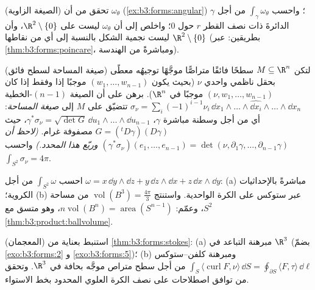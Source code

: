 \begin{exercise}[$\star\star$]\label{exo:b3:forms:4}
(الصيغة الزاوية) تحقق من أن $\omega_\theta$ (\cref{ex:b3:forms:angular}) ؛
واحسب $\int_\gamma\omega_\theta$ من أجل $\gamma$ الدائرةَ ذات نصف القطر $r$ حول
$0$؛ واخلص إلى أن $\omega_\theta$ ليست  على $\R^2\setminus\{0\}$، وأن
$\R^2\setminus\{0\}$ ليست نجمية الشكل بالنسبة إلى أي من نقاطها (بطريقين:
عبر \cref{thm:b3:forms:poincare}، ومباشرةً من الهندسة).
\end{exercise}

\begin{exercise}[$\star\star$]\label{exo:b3:forms:5}
(صيغة المساحة لسطح فائق) لتكن $M \subseteq \R^n$ سطحًا فائقًا متراصًّا
موجَّهًا توجيهُه معطًى بحقل ناظمي واحدي $\nu$ (بحيث يكون $(w_1, \dots, w_{n-1})$
موجبًا إذا وفقط إذا كان $(\nu, w_1, \dots, w_{n-1})$ موجبًا في $\R^n$). برهن على أن
الصيغة $(n-1)$-الخطية $\sigma_\nu =
\sum_i(-1)^{i-1}\nu_i\,\dd x_1\wedge\dots\wedge\widehat{\dd
x_i}\wedge\dots\wedge\dd x_n$ تتضيّق على $M$ إلى \emph{صيغة
المساحة}: أي من أجل وسطنة مباشرة $\gamma$، $\gamma^*\sigma_\nu = \sqrt{\det G}\,\dd u_1\wedge\dots
\wedge\dd u_{n-1}$، حيث $G = ({}^t D\gamma)(D\gamma)$
مصفوفة غرام. \emph{(لاحظ أن $(\gamma^*\sigma_\nu)(e_1, \dots, e_{n-1}) = \det(\nu,
\partial_1\gamma, \dots, \partial_{n-1}\gamma)$ وربّع هذا المحدد.)} واحسب
$\int_{S^2}\sigma_\nu = 4\pi$.
\end{exercise}

\begin{exercise}[$\star\star$]\label{exo:b3:forms:6}
احسب $\int_{S^2}\omega$ من أجل $\omega = x\,\dd y\wedge\dd z
+ y\,\dd z\wedge\dd x + z\,\dd x\wedge\dd y$: (a) مباشرةً بالإحداثيات الكروية؛
(b) عبر ستوكس على الكرة الواحدية. واستنتج $\operatorname{vol}(B^3) = \frac{4\pi}3$ من مساحة
$S^2$، وعمّم:
$n\operatorname{vol}(B^n) = \operatorname{area}(S^{n-1})$،
وهو متسق مع \cref{thm:b3:product:ballvolume}.
\end{exercise}

\begin{exercise}[$\star\star$]\label{exo:b3:forms:7}
(المعجمان) استنبط بعناية من \cref{thm:b3:forms:stokes}: (a) مبرهنة التباعد في
$\R^3$ (بضمّ \cref{exo:b3:forms:2} و \cref{exo:b3:forms:5})؛ (b) ومبرهنة
كلفن--ستوكس $\int_S\langle\operatorname{curl}F, \nu\rangle\,\dd S =
\oint_{\partial S}\langle F, \tau\rangle\,\dd\ell$ من أجل سطح متراص موجَّه بحافة في $\R^3$.
وتحقق من توافق اصطلاحات  على نصف الكرة العلوي المحدود
بخط الاستواء.
\end{exercise}

